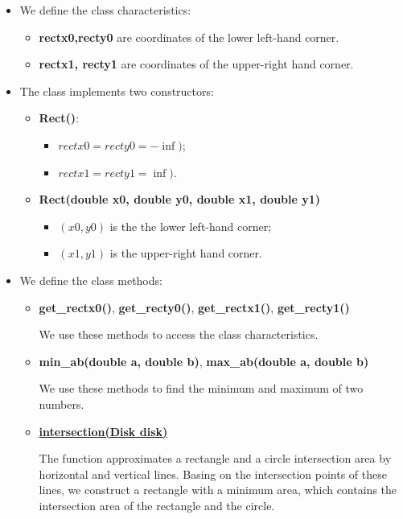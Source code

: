 \documentclass{report}
\begin{document}
	\begin{itemize}
		\item We define the class characteristics: 
		\begin{itemize}
			\item {\bfseries rectx0,recty0} are coordinates of the lower left-hand corner.
			
			\item {\bfseries rectx1, recty1} are coordinates of the upper-right hand corner.
		\end{itemize}
		
		\item The class implements two constructors:
		\begin{itemize}
			\item {\bfseries Rect()}:
			\begin{itemize}
					\item $rectx0 = recty0 = -\inf)$;
					\item $rectx1 = recty1 = \inf)$.
			\end{itemize}
			
			\item {\bfseries Rect(double x0, double y0, double x1, double y1)}
			\begin{itemize}
				\item $(x0, y0)$ is the the lower left-hand corner;
				\item $(x1, y1)$ is the upper-right hand corner. 
			\end{itemize}	
		\end{itemize}
		
		\item We define the class methods:
		
		\begin{itemize}
			\item {\bfseries get\_rectx0()}, {\bfseries get\_recty0()}, {\bfseries get\_rectx1()},  {\bfseries get\_recty1()}
			
			We use these  methods to access the class characteristics.
			
			\item {\bfseries min\_ab(double a, double b)}, {\bfseries max\_ab(double a, double b)}
			
			We use these  methods  to find the minimum and maximum of two numbers.
			
			\item \hyperref [Intersection]{\bfseries intersection(Disk disk)} 
			
			The function approximates a rectangle and a circle intersection area by horizontal and vertical lines. Basing on the intersection points of these lines, we construct a rectangle with a minimum area, which contains the intersection area of the rectangle and the circle.
			

\end{itemize}
\end{itemize}
\end{document}
